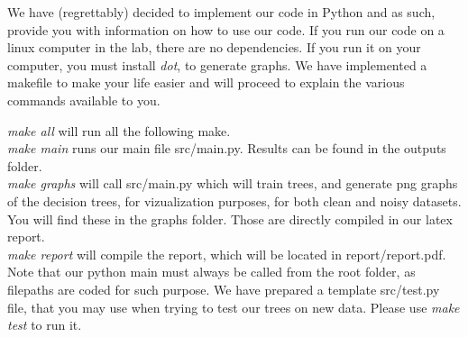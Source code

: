 We have (regrettably) decided to implement our code in Python and as such, provide you with information on how to use our code.
If you run our code on a linux computer in the lab, there are no dependencies. If you run it on your computer, you must install \emph{dot}, to generate graphs.
We have implemented a makefile to make your life easier and will proceed to explain the various commands available to you.

\emph{make all} will run all the following make.\\
\emph{make main} runs our main file  src/main.py. Results can be found in the  outputs folder.\\
\emph{make graphs} will call  src/main.py which will train trees, and generate png graphs of the decision trees, for vizualization purposes,
for both clean and noisy datasets. You will find these in the  graphs folder.
Those are directly compiled in our latex report.\\
\emph{make report} will compile the report, which will be located in report/report.pdf.\\

Note that our python main must always be called from the root folder, as filepaths are coded for such purpose.
We have prepared a template  src/test.py file, that you may use when
trying to test our trees on new data.
Please use  \emph{make test} to run it.





